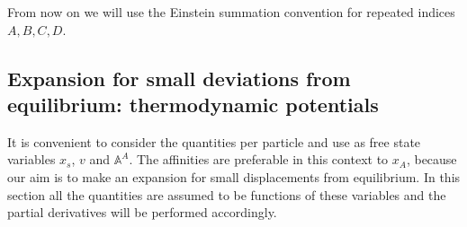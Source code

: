 \documentclass[useAMS,usenatbib,prd,twocolumn,nofootinbib]{revtex4-1}
\begin{document}
From now on we will use the Einstein summation convention for repeated indices $A,B,C,D$.

\subsection{Expansion for small deviations from equilibrium: thermodynamic potentials}\label{EFSDFETP}

It is convenient to consider the quantities per particle and use as free state variables $x_s$, $v$ and $\mathbb{A}^A$. The affinities are preferable in this context to $x_A$, because our aim is to make an expansion for small displacements from equilibrium. In this section all the quantities are assumed to be functions of these variables and the partial derivatives will be performed accordingly.
\end{document}
